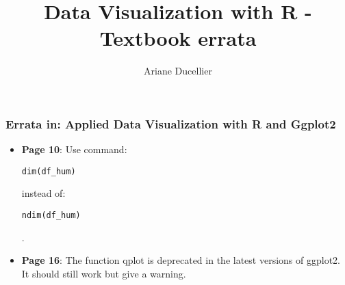 \documentclass{beamer}
\title[Textbook errata]{Data Visualization with R - Textbook errata}
\author{Ariane Ducellier}
\begin{document}
	\begin{frame}
		\titlepage
	\end{frame}

	\begin{frame}[fragile]
		\frametitle{Errata in: Applied Data Visualization with R and Ggplot2}

		\begin{itemize}

		\item \textbf{Page 10}: Use command: \begin{verbatim}dim(df_hum)\end{verbatim} instead of: \begin{verbatim}ndim(df_hum)\end{verbatim}.

		\item \textbf{Page 16}: The function qplot is deprecated in the latest versions of ggplot2. It should still work but give a warning.

		\end{itemize}
	\end{frame}
\end{document}
